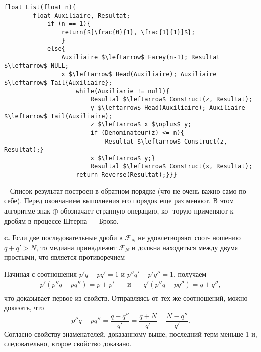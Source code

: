 \begin{lstlisting}[mathescape = true, caption = {Прохождение ряда Фарея}]
	float List(float n){
		float Auxiliaire, Resultat;
			if (n == 1){
				return{$[\frac{0}{1}, \frac{1}{1}]$};
				}
			else{
				Auxiliaire $\leftarrow$ Farey(n-1); Resultat $\leftarrow$ NULL;
				x $\leftarrow$ Head(Auxiliaire); Auxiliaire $\leftarrow$ Tail{Auxiliaire};
					while(Auxiliarie != null){
						Resultal $\leftarrow$ Construct(z, Resultat);
						у $\leftarrow$ Head(Auxiliaire); Auxiliaire $\leftarrow$ Tail(Auxiliaire);
						z $\leftarrow$ x $\oplus$ y;
						if (Denominateur(z) <= n){
							Resultat $\leftarrow$ Construct(z, Resultat);}
						x $\leftarrow$ y;}
						Resultal $\leftarrow$ Construct(x, Resultat);
					return Reverse(Resultat);}}}
			\end{lstlisting}
	\ \newline
\hspace*{15pt} Список-результат построен в обратном порядке (что не очень важно­\linebreak
само по себе). Перед окончанием выполнения его порядок еще раз\linebreak 
меняют. В этом алгоритме знак $\oplus$  обозначает странную операцию, ко-\linebreak
торую применяют к дробям в процессе Штерна — Броко.

\pagebreak

\textbf{c.} Если две последовательные дроби в $\mathcal{F}_N$ не удовлетворяют соот-­\linebreak
ношению $q + q' > N$, то медиана принадлежит $\mathcal{F}_N$ и должна находиться\linebreak
между двумя простыми, что является противоречием

Начиная с соотношения $p'q - pq' = 1$ и $p''q' - p'q'' = 1$,  получаем
		$$\begin{array}{cccc}
				p'(p''q - pq'') = p + p' & \quad\text{и}\quad & q'(p{''}q - pq{''}) = q + q'',\\
		\end{array}$$
что доказывает первое из свойств. Отправляясь от тех же соотношений,\linebreak
можно доказать, что 
$$p''q - pq'' = \frac{q + q''}{q'} = \frac{q + N}{q'} - \frac{N - q''}{q'}.$$
\noindent Согласно свойству знаменателей, доказанному выше, последний терм\linebreak
меньше 1 и, следовательно, второе свойство доказано.

